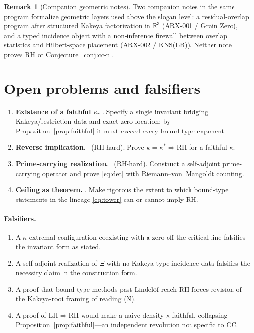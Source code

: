 \documentclass[11pt]{amsart}
\theoremstyle{plain}
\theoremstyle{definition}
\newtheorem{remark}[theorem]{Remark}
\newcommand{\RH}{\mathrm{RH}}
\newcommand{\LH}{\mathrm{LH}}
\newcommand{\CC}{\mathrm{CC}}
\begin{document}
\begin{remark}[Companion geometric notes]
Two companion notes in the same program formalize geometric layers used above
the slogan level:
a residual-overlap program after structured Kakeya factorization in
$\mathbb{R}^3$ (ARX-001 / Grain Zero), and a typed incidence object with a
non-inference firewall between overlap statistics and Hilbert-space placement
(ARX-002 / KNS(LB)).
Neither note proves $\RH$ or Conjecture~\ref{conj:cc-n}.
\end{remark}

\section{Open problems and falsifiers}
\label{sec:open}

\begin{enumerate}[label=\textbf{OP\arabic*.},leftmargin=*]
  \item \label{op:kappa}
  \textbf{Existence of a faithful $\kappa$.}
  \PeAIceOpen.
  Specify a single invariant bridging Kakeya/restriction data and exact zero
  location; by Proposition~\ref{prop:faithful} it must exceed every bound-type
  exponent.
  \item
  \textbf{Reverse implication.}
  \PeAIceOpen\ (RH-hard).
  Prove $\kappa=\kappa^*\Rightarrow\RH$ for a faithful $\kappa$.
  \item
  \textbf{Prime-carrying realization.}
  \PeAIceOpen\ (RH-hard).
  Construct a self-adjoint prime-carrying operator and prove \eqref{eq:det}
  with Riemann--von~Mangoldt counting.
  \item \label{op:ceiling}
  \textbf{Ceiling as theorem.}
  \PeAIceOpen.
  Make rigorous the extent to which bound-type statements in the lineage
  \eqref{eq:tower} can or cannot imply $\RH$.
\end{enumerate}

\paragraph{Falsifiers.}
\begin{enumerate}[label=\textbf{F\arabic*.},leftmargin=*]
  \item A $\kappa$-extremal configuration coexisting with a zero off the critical
  line falsifies the invariant form as stated.
  \item A self-adjoint realization of $\Xi$ with no Kakeya-type incidence data
  falsifies the necessity claim in the construction form.
  \item A proof that bound-type methods past Lindel\"of reach $\RH$ forces
  revision of the Kakeya-root framing of reading (N).
  \item A proof of $\LH\Rightarrow\RH$ would make a naive density $\kappa$
  faithful, collapsing Proposition~\ref{prop:faithful}---an independent
  revolution not specific to $\CC$.
\end{enumerate}
\end{document}
